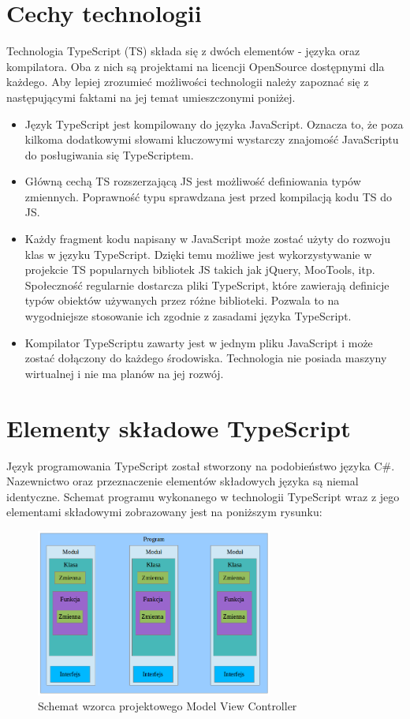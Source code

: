 \section{Cechy technologii}
Technologia TypeScript (TS) składa się z dwóch elementów - języka oraz kompilatora. Oba z nich są projektami na licencji OpenSource dostępnymi dla każdego. Aby lepiej zrozumieć możliwości technologii należy zapoznać się z następującymi faktami na jej temat umieszczonymi poniżej.
\begin{itemize}
\item Język TypeScript jest kompilowany do języka JavaScript. Oznacza to, że poza kilkoma dodatkowymi słowami kluczowymi wystarczy znajomość JavaScriptu do posługiwania się TypeScriptem. 
\item Główną cechą TS rozszerzającą JS jest możliwość definiowania typów zmiennych. Poprawność typu sprawdzana jest przed kompilacją kodu TS do JS.
\item Każdy fragment kodu napisany w JavaScript może zostać użyty do rozwoju klas w języku TypeScript. Dzięki temu możliwe jest wykorzystywanie w projekcie TS popularnych bibliotek JS takich jak jQuery, MooTools, itp. Społeczność regularnie dostarcza pliki TypeScript, które zawierają definicje typów obiektów używanych przez różne biblioteki. Pozwala  to na wygodniejsze stosowanie ich zgodnie z zasadami języka TypeScript. 
\item Kompilator TypeScriptu zawarty jest w jednym pliku JavaScript i może zostać dołączony do każdego środowiska. Technologia nie posiada maszyny wirtualnej i nie ma planów na jej rozwój.
\end{itemize}

\section {Elementy składowe TypeScript}
Język programowania TypeScript został stworzony na podobieństwo języka C\#. Nazewnictwo oraz przeznaczenie elementów składowych języka są niemal identyczne.
Schemat programu wykonanego w technologii TypeScript wraz z jego elementami składowymi zobrazowany jest na poniższym rysunku:
\begin{figure}[h]
	\includegraphics[height=55mm]{./img/typescript-program.png}
	\caption{Schemat wzorca projektowego Model View Controller}
	\label{fig:mvc-scheme}
\end{figure}

